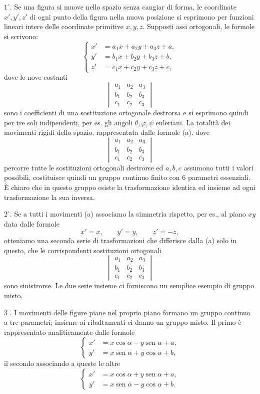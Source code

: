 \documentclass[11pt]{book}
\newcommand{\sen}{\operatorname{sen}}
\begin{document}
$1^{\circ}$. Se una figura si muove nello spazio senza cangiar di forma, le coordinate $x',y',z'$ di ogni punto della figura nella nuova posizione si esprimono per funzioni lineari intere delle coordinate primitive $x,y,z$. Supposti assi ortogonali, le formole si scrivono:
\[
\left\{
\begin{aligned}
 x'&=a_1x+a_2y+a_3z+a,\\
 y'&=b_1x+b_2y+b_3z+b,\\
 z'&=c_1x+c_2y+c_3z+c,
\end{aligned}\right.\tag{a}
\]
dove le nove costanti
\[
\begin{vmatrix}
 a_1&a_2&a_3\\
 b_1&b_2&b_3\\
 c_1&c_2&c_3
\end{vmatrix}
\]
sono i coefficienti di una sostituzione ortogonale destrorsa e si esprimono quindi per tre soli indipendenti, per es. gli angoli $\theta,\varphi,\psi$ euleriani. La totalità dei movimenti rigidi dello spazio, rappresentata dalle formole (a), dove
\[
\begin{vmatrix}
 a_1&a_2&a_3\\
 b_1&b_2&b_3\\
 c_1&c_2&c_3
\end{vmatrix}
\]
percorre tutte le sostituzioni ortogonali destrorse ed $a,b,c$ assumono tutti i valori possibili, costituisce quindi un gruppo continuo finito con 6 parametri essenziali. È chiaro che in questo gruppo esiste la trasformazione identica ed insieme ad ogni trasformazione la sua inversa.

$2^{\circ}$. Se a tutti i movimenti (a) associamo la simmetria rispetto, per es., al piano $xy$ data dalle formole
\[
 x'=x,
 \qquad y'=y,
 \qquad z'=-z,
\]
otteniamo una seconda serie di trasformazioni che differisce dalla (a) solo in questo, che le corrispondenti sostituzioni ortogonali
\[
\begin{vmatrix}
 a_1&a_2&a_3\\
 b_1&b_2&b_3\\
 c_1&c_2&c_3
\end{vmatrix}
\]
sono sinistrorse. Le due serie insieme ci forniscono un semplice esempio di gruppo misto.

$3^{\circ}$. I movimenti delle figure piane nel proprio piano formano un gruppo continuo a tre parametri; insieme ai ribaltamenti ci danno un gruppo misto. Il primo è rappresentato analiticamente dalle formole
\[
\left\{
\begin{aligned}
 x'&=x\cos\alpha-y\sen\alpha+a,\\
 y'&=x\sen\alpha+y\cos\alpha+b,
\end{aligned}\right.
\]
il secondo associando a queste le altre
\[
\left\{
\begin{aligned}
 x'&=x\cos\alpha+y\sen\alpha+a,\\
 y'&=x\sen\alpha-y\cos\alpha+b.
\end{aligned}\right.
\]
\end{document}
